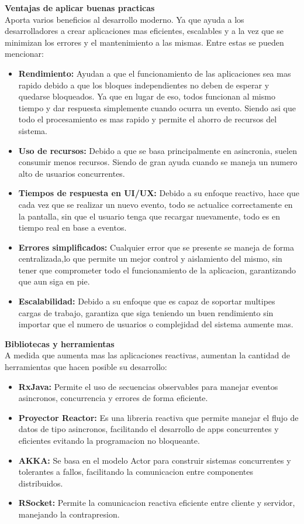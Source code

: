 \documentclass[12pt]{article}
\begin{document}
\vspace{1em}
\textbf{Ventajas de aplicar buenas practicas} \\
Aporta varios beneficios al desarrollo moderno. Ya que ayuda a los desarrolladores a crear aplicaciones mas eficientes, escalables y a la vez que se minimizan los errores y el mantenimiento a las mismas. Entre estas se pueden mencionar:
\begin{itemize}
    \item\textbf{Rendimiento:} Ayudan a que el funcionamiento de las aplicaciones sea mas rapido debido a que los bloques independientes no deben de esperar y quedarse bloqueados. Ya que en lugar de eso, todos funcionan al mismo tiempo y dar respuesta simplemente cuando ocurra un evento.  Siendo asi que todo el procesamiento es mas rapido y permite el ahorro de recursos del sistema.
    \item \textbf{Uso de recursos: } Debido a que se basa principalmente en asincronia, suelen consumir menos recursos. Siendo de gran ayuda cuando se maneja un numero alto de usuarios concurrentes.
    \item\textbf{Tiempos de respuesta en UI/UX: } Debido a su enfoque reactivo, hace que cada vez que se realizar un nuevo evento, todo se actualice correctamente en la pantalla, sin que el usuario tenga que recargar nuevamente, todo es en tiempo real en base a eventos.
    \item\textbf{Errores simplificados: } Cualquier error que se presente se maneja de forma centralizada,lo que permite un mejor control y aislamiento del mismo, sin tener que comprometer todo el funcionamiento de la aplicacion, garantizando que aun siga en pie.
    \item\textbf{Escalabilidad: } Debido a su enfoque que es capaz de soportar multipes cargas de trabajo, garantiza que siga teniendo un buen rendimiento sin importar que el numero de usuarios o complejidad del sistema aumente mas. 
\end{itemize}

\textbf{Bibliotecas y herramientas}\\ 
A medida que aumenta mas las aplicaciones reactivas, aumentan la cantidad de herramientas que hacen posible su desarrollo: 
\begin{itemize}
    \item\textbf{RxJava:} Permite el uso de secuencias observables para manejar eventos asincronos, concurrencia y errores de forma eficiente.
    \item\textbf{Proyector Reactor: } Es una libreria reactiva que permite manejar el flujo de datos de tipo asincronos, facilitando el desarrollo de apps concurrentes y eficientes evitando la programacion no bloqueante.
    \item\textbf{AKKA: } Se basa en el modelo Actor para construir sistemas concurrentes y tolerantes a fallos, facilitando la comunicacion entre componentes distribuidos. 
    \item\textbf{RSocket: } Permite la comunicacion reactiva eficiente entre cliente y servidor, manejando la contrapresion.
\end{itemize}
\end{document}
